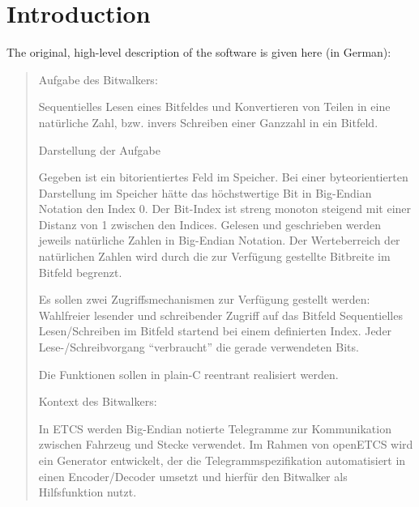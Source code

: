 
\chapter{Introduction}
\label{sec:introduction}

The original, high-level description of the \bitwalker software is given here (in German):


\begin{quote}
 
Aufgabe des Bitwalkers:
 
Sequentielles Lesen eines Bitfeldes und Konvertieren von Teilen in eine natürliche Zahl,
bzw. invers Schreiben einer Ganzzahl in ein Bitfeld.
 
Darstellung der Aufgabe
 
Gegeben ist ein bitorientiertes Feld im Speicher.
Bei einer byteorientierten Darstellung im Speicher hätte das höchstwertige Bit
in Big-Endian Notation den Index 0.
Der Bit-Index ist streng monoton steigend mit einer Distanz von 1 zwischen den Indices.
Gelesen und geschrieben werden jeweils natürliche Zahlen in Big-Endian Notation.
Der Werteberreich der natürlichen Zahlen wird durch die zur Verfügung gestellte Bitbreite
im Bitfeld begrenzt.
 
Es sollen zwei Zugriffsmechanismen zur Verfügung gestellt werden:
Wahlfreier lesender und schreibender Zugriff auf das Bitfeld
Sequentielles Lesen/Schreiben im Bitfeld startend bei einem definierten Index.
Jeder Lese-/Schreibvorgang ``verbraucht'' die gerade verwendeten Bits.
 
Die Funktionen sollen in plain-C reentrant realisiert werden.
 
Kontext des Bitwalkers:
 
In ETCS werden Big-Endian notierte Telegramme zur Kommunikation zwischen Fahrzeug und
Stecke verwendet.
Im Rahmen von openETCS wird ein Generator entwickelt,
der die Telegrammspezifikation automatisiert in einen
Encoder/Decoder umsetzt und hierfür den Bitwalker als Hilfsfunktion nutzt.
\end{quote}






